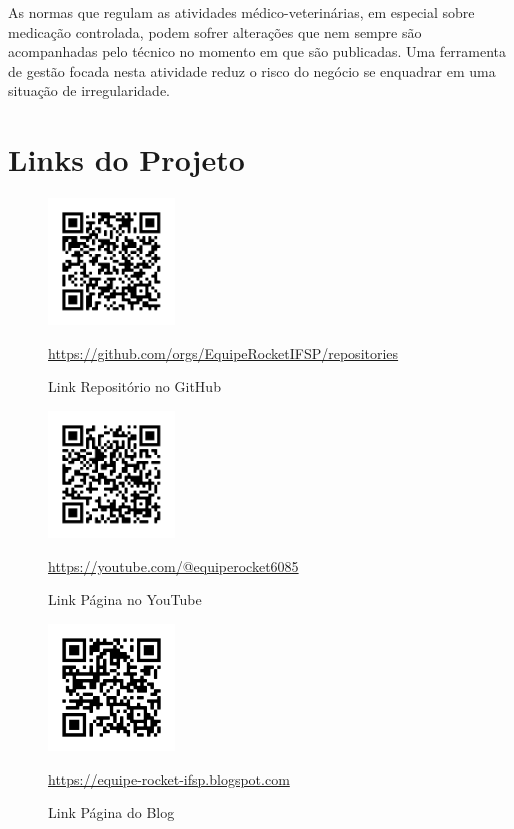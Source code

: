 \documentclass[
    12pt,               %
    openright,          %
    oneside,
    a4paper,            %
    BIBLATEX,           %
    TODO,               %
    english,            %
    brazil              %
    ]{ifsp-spo-inf-ctds}
\begin{document}
    As normas que regulam as atividades médico-veterinárias, em especial sobre medicação controlada, podem sofrer alterações que nem sempre são acompanhadas pelo técnico no momento em que são publicadas. Uma ferramenta de gestão focada nesta atividade reduz o risco do negócio se enquadrar em uma situação de irregularidade.

\chapter[Links do Projeto]{Links do Projeto}
    \begin{figure} [htb!]
        \centering
        \includegraphics[width=0.3\textwidth]{qrcode/qrcode_GIT.png}
        \caption{Link Repositório no GitHub}
        {\footnotesize \url{ https://github.com/orgs/EquipeRocketIFSP/repositories}}
        \label{fig:qrcode_GIT}
    \end{figure}

     \begin{figure}[htb!]
        \centering
        \includegraphics [width=0.3\textwidth]{qrcode/qrcode_YT.png}
        \caption{Link Página no YouTube}
        {\footnotesize \url{https://youtube.com/@equiperocket6085}}
        \label{fig:qrcode_YT}
    \end{figure}
    
    \begin{figure}[htb!]
        \centering
        \includegraphics[width=0.3\textwidth]{qrcode/qrcode_BLOG.png}
        \caption{Link Página do Blog}
        {\footnotesize \url{https://equipe-rocket-ifsp.blogspot.com}}
        \label{fig:qrcode_BLOG}
    \end{figure}
    
\end{document}
